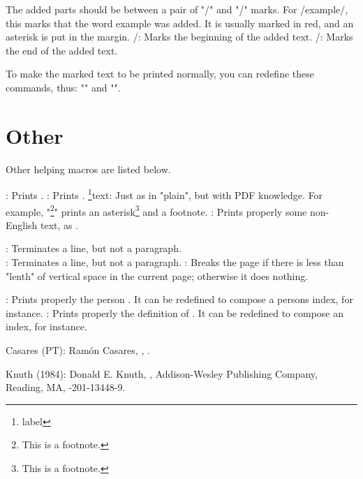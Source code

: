The added parts should be between a pair of "\new/" and "\wen/" marks.
For \new/example\wen/, this marks that the word example was added.
It is usually marked in red, and an asterisk is put in the margin.
\command\new/: Marks the beginning of the added text.
\command\wen/: Marks the end of the added text.

To make the marked text to be printed normally,
you can redefine these commands, thus:
"\def\new/{\relax}" and "\def\wen/{\relax}".


\section{Other}

Other helping macros are listed below.

\command\todayiso: Prints \todayiso.
\command\QED: Prints \QED.
\command\footnote{label}{text}: Just as in "plain",
 but with PDF knowledge.
 For example, "\footnote*{This is a footnote.}" prints
 an asterisk\footnote*{This is a footnote.} and a footnote.
\command{}: Prints properly some
 non-English text, as .

\command\newline: Terminates a line, but not a paragraph.
\command\\: Terminates a line, but not a paragraph.
\command{}: Breaks the page if there is
 less than "lenth" of vertical space in the current page;
 otherwise it does nothing.

\command{}: Prints properly the person .
 It can be redefined to compose a persons index, for instance.
\command{}: Prints properly
 the definition of .
 It can be redefined to compose an index, for instance.



\biblabel Casares (PT):
Ramón Casares,
,
.

\biblabel Knuth (1984):
Donald E. Knuth,
,
Addison-Wesley Publishing Company, Reading, MA,
-201-13448-9.





\bye
